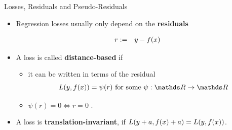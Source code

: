 \begin{vbframe}{Losses, Residuals and Pseudo-Residuals}

\begin{itemize}
\item Regression losses usually only depend on the \textbf{ residuals}

\vspace*{-0.5cm}

\begin{eqnarray*}
  r &:=& y - \fx %
\end{eqnarray*}


\item A loss is called \textbf{distance-based} if
\begin{itemize}
  \item it can be written in terms of the residual
  $$
    \Lxy = \psi (r) \text{ for some } \psi: \R \to \R
  $$
  \item $\psi(r) = 0 \Leftrightarrow r = 0$ .
\end{itemize}
\item A loss is \textbf{translation-invariant}, if $L(y + a, f(x) + a) = L(y, f(x))$.


\framebreak 


% 


\end{itemize}
\end{vbframe}
